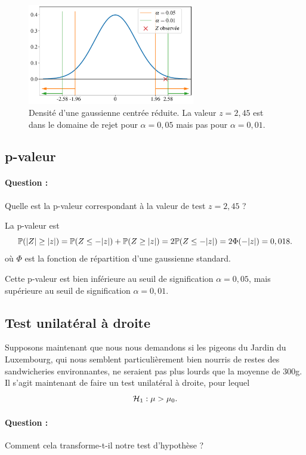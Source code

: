 \begin{figure}[h]
	\centering
	\includegraphics[width=0.65\textwidth]{figures/tests/z_pigeons}
	\caption{Densité d'une gaussienne centrée réduite. La valeur $z=2,45$ est
		dans le domaine de rejet pour $\alpha = 0,05$ mais pas pour
		$\alpha = 0,01$.}
	\label{fig:z_pigeons}
\end{figure}

\subsection{p-valeur}
\paragraph{Question :} Quelle est la p-valeur correspondant à la valeur de test
$z=2,45$ ?
\bigskip

\begin{answer}
	La p-valeur est
	\[
	\mathbb{P}(\lvert Z\rvert \geq \lvert z\rvert) = \mathbb{P}(Z \leq -\lvert z\rvert) + \mathbb{P}(Z \geq \lvert z\rvert) = 2
	\mathbb{P}(Z \leq -\lvert z\rvert) = 2 \Phi(-\lvert z\rvert) = 0,018.
	\]
	où $\Phi$ est la fonction de répartition d'une gaussienne standard.
	
	Cette p-valeur est bien inférieure au seuil de signification $\alpha = 0,05$,
	mais supérieure au seuil de signification $\alpha = 0,01$.
\end{answer}

\subsection{Test unilatéral à droite}
Supposons maintenant que nous nous demandons si les pigeons du Jardin du
Luxembourg, qui nous semblent particulièrement bien nourris de restes des
sandwicheries environnantes, ne seraient pas plus lourds que la moyenne de
300g. Il s'agit maintenant de faire un test unilatéral à droite, pour lequel
\[
\mathcal{H}_1 : \mu > \mu_0.
\]

\paragraph{Question :} Comment cela transforme-t-il notre test d'hypothèse ?
\bigskip

